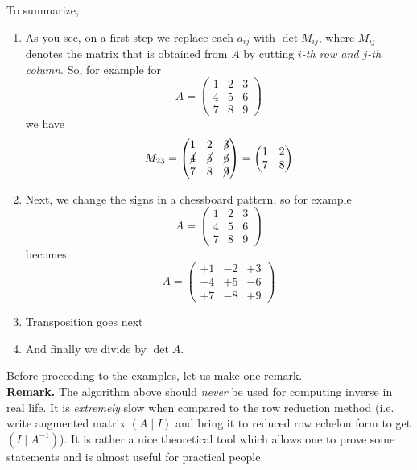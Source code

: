 \documentclass[8pt]{article} %
\begin{document}
	To summarize,
	\begin{enumerate}
		\item As you see, on a first step we replace each $a_{ij}$ with $\det M_{ij}$, where $M_{ij}$ denotes the matrix that is obtained
			from $A$ by cutting \textit{$i$-th row and $j$-th column}. So, for example for 
			\[A=\begin{pmatrix}1&2&3\\4&5&6\\7&8&9\end{pmatrix}\] we have 
				\[M_{23}=\begin{pmatrix}1&2&\cancel{3}\\
					\cancel{4}&\cancel{5}&\cancel{6}\\
					7&8&\cancel{9}\end{pmatrix}=
					\begin{pmatrix}1&2\\7&8\end{pmatrix}\]
		\item Next, we change the signs in a chessboard pattern, so for example
			\[A=\begin{pmatrix}1&2&3\\4&5&6\\7&8&9\end{pmatrix}\] becomes
			\[A=\begin{pmatrix}+1&-2&+3\\-4&+5&-6\\+7&-8&+9\end{pmatrix}\]
		\item Transposition goes next
		\item And finally we divide by $\det A$.
	\end{enumerate}
Before proceeding to the examples, let us make one remark.\\
\textbf{Remark. } The algorithm above should \textit{never} be used for computing inverse in real life. It is \textit{extremely} slow when
compared to the row reduction method (i.e. write augmented matrix $(A\mid I)$ and bring it to reduced row echelon form to get $(I\mid A^{-1})$).
It is rather a nice theoretical tool which allows one to prove some statements and is almost useful for practical people.
\end{document}
